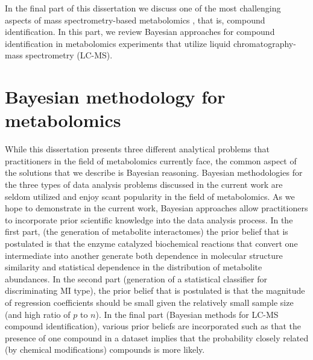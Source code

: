 \begin{DoubleSpace*}
In the final part of this dissertation we discuss one of the most challenging aspects of mass spectrometry-based metabolomics \cite{dunn2012}, that is, compound identification. In this part, we review Bayesian approaches for compound identification in metabolomics experiments that utilize liquid chromatography-mass spectrometry (LC-MS).

\section{Bayesian methodology for metabolomics}
While this dissertation presents three different analytical problems that practitioners in the field of metabolomics currently face, the common aspect of the solutions that we describe is Bayesian reasoning. Bayesian methodologies for the three types of data analysis problems discussed in the current work are seldom utilized and enjoy scant popularity in the field of metabolomics. As we hope to demonstrate in the current work, Bayesian approaches allow practitioners to incorporate prior scientific knowledge into the data analysis process. In the first part, (the generation of metabolite interactomes) the prior belief that is postulated is that the enzyme catalyzed biochemical reactions that convert one intermediate into another generate both dependence in molecular structure similarity and statistical dependence in the distribution of metabolite abundances. In the second part (generation of a statistical classifier for discriminating MI type), the prior belief that is postulated is that the magnitude of regression coefficients should be small given the relatively small sample size (and high ratio of $p$ to $n$). In the final part (Bayesian methods for LC-MS compound identification), various prior beliefs are incorporated such as that the presence of one compound in a dataset implies that the probability closely related (by chemical modifications) compounds is more likely. 


\end{DoubleSpace*}
